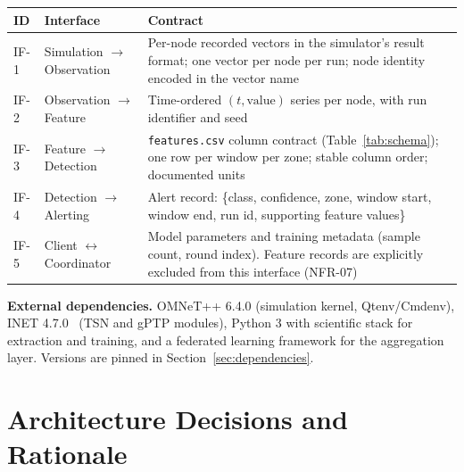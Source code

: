 \begin{longtable}{p{} p{} p{}}
\toprule
\textbf{ID} & \textbf{Interface} & \textbf{Contract} \\
\midrule
\endhead
IF-1 & Simulation $\rightarrow$ Observation &
Per-node recorded vectors in the simulator's result format; one vector per node per
run; node identity encoded in the vector name \\
\addlinespace
IF-2 & Observation $\rightarrow$ Feature &
Time-ordered $(t, \text{value})$ series per node, with run identifier and seed \\
\addlinespace
IF-3 & Feature $\rightarrow$ Detection &
\texttt{features.csv} column contract (Table~\ref{tab:schema}); one row per window per
zone; stable column order; documented units \\
\addlinespace
IF-4 & Detection $\rightarrow$ Alerting &
Alert record: \{class, confidence, zone, window start, window end, run id,
supporting feature values\} \\
\addlinespace
IF-5 & Client $\leftrightarrow$ Coordinator &
Model parameters and training metadata (sample count, round index). Feature records
are explicitly excluded from this interface (NFR-07) \\
\bottomrule
\end{longtable}

\textbf{External dependencies.} OMNeT++ 6.4.0 (simulation kernel, Qtenv/Cmdenv),
INET 4.7.0~\cite{inettsn} (TSN and gPTP modules), Python 3 with scientific stack for extraction and
training, and a federated learning framework for the aggregation layer. Versions are
pinned in Section~\ref{sec:dependencies}.

\section{Architecture Decisions and Rationale}
\label{sec:arch-decisions}


